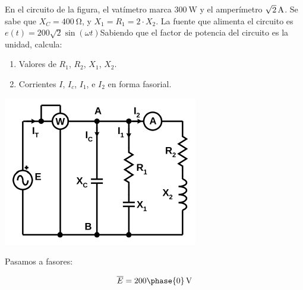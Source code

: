 \documentclass[12pt]{article}
\begin{document}




En el circuito de la figura, el vatímetro marca $\SI{300}{\watt}$ y el amperímetro $\SI[parse-numbers=false]{\sqrt{2}}{\ampere}$. Se sabe que $X_C = \SI{400}{\ohm}$, y $X_1 = R_1 = 2 \cdot X_2$. La fuente que alimenta el circuito es $e(t) = 200\sqrt{2} \sin(\omega t)$Sabiendo que el factor de potencia del circuito es la unidad, calcula:

\begin{enumerate}
\item Valores de $R_1$, $R_2$, $X_1$, $X_2$.
\item Corrientes $I$, $I_c$, $I_1$, e $I_2$ en forma fasorial. 
\end{enumerate}

\begin{center}
  \includegraphics{figs/problema11}
\end{center}


Pasamos a fasores:

\[
  \overline{E} = \SI[parse-numbers=false]{200\phase{0}}{\volt}
\]
\end{document}
